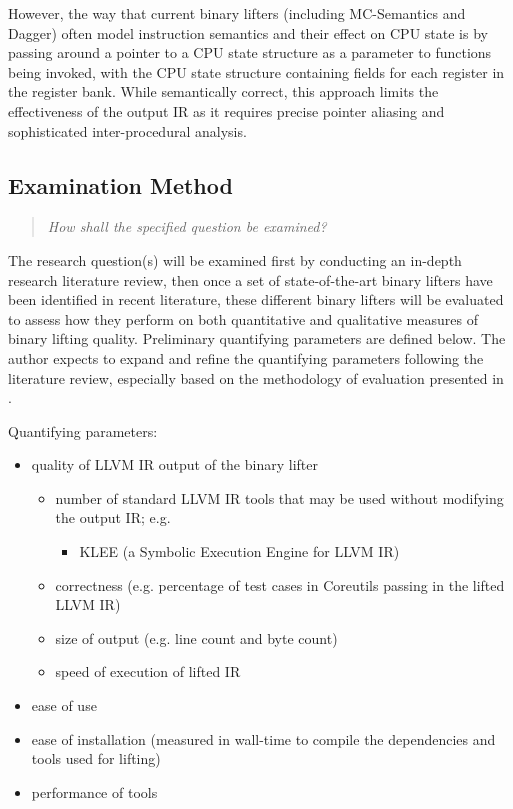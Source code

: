 \documentclass[12pt, a4paper]{article}
\begin{document}
However, the way that current binary lifters (including MC-Semantics and Dagger) often model instruction semantics and their effect on CPU state is by passing around a pointer to a CPU state structure as a parameter to functions being invoked, with the CPU state structure containing fields for each register in the register bank. While semantically correct, this approach limits the effectiveness of the output IR as it requires precise pointer aliasing and sophisticated inter-procedural analysis.


\subsection{Examination Method}

\begin{quote}
	\textit{How shall the specified question be examined?}
\end{quote}

The research question(s) will be examined first by conducting an in-depth research literature review, then once a set of state-of-the-art binary lifters have been identified in recent literature, these different binary lifters will be evaluated to assess how they perform on both quantitative and qualitative measures of binary lifting quality. Preliminary quantifying parameters are defined below. The author expects to expand and refine the quantifying parameters following the literature review, especially based on the methodology of evaluation presented in \cite{evaluation_of_irs}.

Quantifying parameters:
\begin{itemize}
	\item quality of LLVM IR output of the binary lifter
	\begin{itemize}
		\item number of standard LLVM IR tools that may be used without modifying the output IR; e.g.
		\begin{itemize}
			\item KLEE (a Symbolic Execution Engine for LLVM IR)
		\end{itemize}
		\item correctness (e.g. percentage of test cases in Coreutils passing in the lifted LLVM IR)
		\item size of output (e.g. line count and byte count)
		\item speed of execution of lifted IR
	\end{itemize}
	\item ease of use
	\item ease of installation (measured in wall-time to compile the dependencies and tools used for lifting)
	\item performance of tools
\end{itemize}
\end{document}
